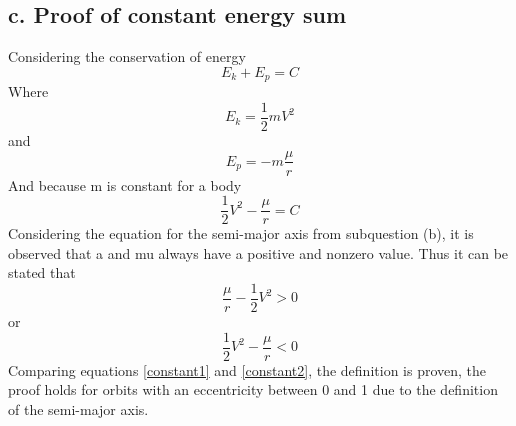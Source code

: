 \subsection{c. Proof of constant energy sum}
Considering the conservation of energy
\begin{equation}
E_k + E_p = C
\end{equation}
Where
\begin{equation}
E_k = \frac{1}{2}mV^2
\end{equation}
and
\begin{equation}
E_p = -m\frac{\mu}{r}
\end{equation}
And because m is constant for a body
\begin{equation}
\frac{1}{2} V^2 - \frac{\mu}{r} = C
\label{constant1}
\end{equation}
Considering the equation for the semi-major axis from subquestion (b), it is observed that a and mu always have a positive and nonzero value. Thus it can be stated that 
\begin{equation}
\frac{\mu}{r} - \frac{1}{2}V^2 > 0 
\end{equation}
or
\begin{equation}
\frac{1}{2} V^2 - \frac{\mu}{r} < 0
\label{constant2}
\end{equation}
Comparing equations \ref{constant1} and \ref{constant2}, the definition is proven, the proof holds for orbits with an eccentricity between 0 and 1 due to the definition of the semi-major axis.

